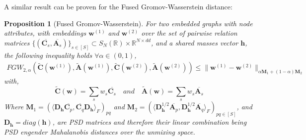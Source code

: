 \documentclass{article}
\newcommand{\scalar}[2]{\langle #1 , #2 \rangle}
\def\vh{{\bm{h}}}
\def\vw{{\bm{w}}}
\def\mA{{\bm{A}}}
\def\mC{{\bm{C}}}
\def\mD{{\bm{D}}}
\def\mM{{\bm{M}}}
\newcommand{\R}{\mathbb{R}}
\def\R{{\mathbb{R}}}
\newtheorem{proposition}{Proposition}
\begin{document}
	A similar result can be proven for the Fused Gromov-Wasserstein distance:
	\begin{proposition}[Fused Gromov-Wasserstein]
		For two embedded graphs with node attributes, with embeddings $\vw^{(1)}$ and $\vw^{(2)}$ over the set of pairwise relation matrices $\{(\overline{\mC_s},\overline{\mA_s})\}_{s\in[S]} \subset S_N(\R) \times \R^{N\times dd}$, and a shared masses vector $\vh$, the following inequality holds $\forall \alpha \in (0,1)$,
		\begin{equation}
		\begin{split}
		FGW_{2,\alpha}\left(\widetilde{\mC}(\vw^{(1)}), \widetilde{\mA}(\vw^{(1)}), \widetilde{\mC}(\vw^{(2)}), \widetilde{\mA}(\vw^{(2)})\right) \label{eq:mah_fgw}\leq \| \vw^{(1)} - \vw^{(2)}\|_{\alpha\mM_1 +(1-\alpha)\mM_2}
		\end{split}
		\end{equation}
		with,
		\begin{equation}
		\widetilde{\mC}(\vw)= \sum_s w_s \overline{\mC_s}  \quad \textit{and} \quad \widetilde{\mA}(\vw)= \sum_s w_s \overline{\mA_s}
		\end{equation}
		Where $\mM_1 = \left(\scalar{\mD_{\vh}\overline{\mC_p}}{ \overline{\mC_q}\mD_{\vh}}_F\right)_{pq}$ and $\mM_2=(\scalar{\mD_{\vh}^{1/2}\overline{\mA_p}}{\mD_{\vh}^{1/2}\overline{\mA_q}}_F)_{pq \in [S]}$, and $\mD_{\vh} = diag(\vh)$, are PSD matrices and therefore their linear combination being PSD engender Mahalanobis distances over the unmixing space.
	\end{proposition} 
\end{document}

